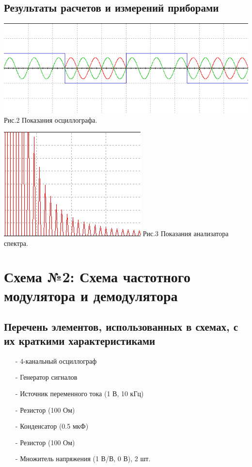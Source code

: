 \documentclass[11pt]{article}
\begin{document}
\subsection{Результаты расчетов и измерений приборами}
\begin{center}
    \includegraphics[width=1\linewidth]{img/osc1.png}
        Рис.2 Показания осциллографа.
\end{center}

\begin{center}
    \includegraphics[width=1\linewidth]{img/chast1.png}
        Рис.3 Показания анализатора спектра.
\end{center}


\newpage
\section{Схема №2: Схема частотного модулятора и демодулятора}
\subsection{Перечень элементов, использованных в схемах, с их краткими характеристиками}
\begin{itemize}
    \item[-] 4-канальный осциллограф
    \item[-] Генератор сигналов
    \item[-] Источник переменного тока (1 В, 10 кГц)
    \item[-] Резистор (100 Ом)
    \item[-] Конденсатор (0.5 мкФ)
    \item[-] Резистор (100 Ом)
    \item[-] Множитель напряжения (1 В/В, 0 В), 2 шт.  
\end{itemize}
\end{document}
